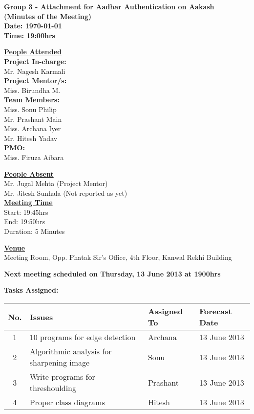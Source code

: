 \documentclass[a4paper,12pt]{article}
\begin{document}
\LARGE
\begin{center}
\textbf
{
Group 3 - Attachment for Aadhar Authentication on Aakash\\
(Minutes of the Meeting) \\ 
Date: \today \\
Time: 19:00hrs
}
\end{center}

\vfill

\large

\underline{\textbf{People Attended}} \\ 

\indent \textbf{Project In-charge:} \\
\indent Mr. Nagesh Karmali \\

\indent \textbf{Project Mentor/s:} \\
\indent Miss. Birundha M.\\

\indent \textbf{Team Members:} \\
\indent Miss. Sonu Philip \\
\indent Mr. Prashant Main \\
\indent Miss. Archana Iyer \\
\indent Mr. Hitesh Yadav \\

\indent \textbf{PMO:} \\
\indent Miss. Firuza Aibara

\underline{\textbf{People Absent}} \\ 
\indent Mr. Jugal Mehta (Project Mentor)\\
\indent Mr. Jitesh Sunhala (Not reported as yet)\\

\vskip20pt
\underline{\textbf{Meeting Time}} \\
\indent Start: 19:45hrs \\
\indent End: 19:50hrs \\
\indent Duration: 5 Minutes 

\underline{\textbf{Venue}} \\
\indent Meeting Room, Opp. Phatak Sir's Office, 4th Floor, Kanwal Rekhi Building

\pagebreak

\vskip20pt
\textbf{Next meeting scheduled on Thursday, 13 June 2013 at 1900hrs}

\vskip20pt
\textbf{Tasks Assigned:}
\vskip10pt
\begin{tabular}{|c|p{6cm}|p{3cm}|p{4cm}|}
 \hline
 \hline
 \textbf{No.} & \textbf{Issues} & \textbf{Assigned To} & \textbf{Forecast Date} \\
  \hline
1 & 10 programs for edge detection & Archana & 13 June 2013 \\
  \hline
2 & Algorithmic analysis for sharpening image & Sonu & 13 June 2013 \\
  \hline
3 & Write programs for threshoulding & Prashant & 13 June 2013 \\
  \hline
4 & Proper class diagrams & Hitesh & 13 June 2013 \\
  \hline
\end{tabular}
\end{document}
